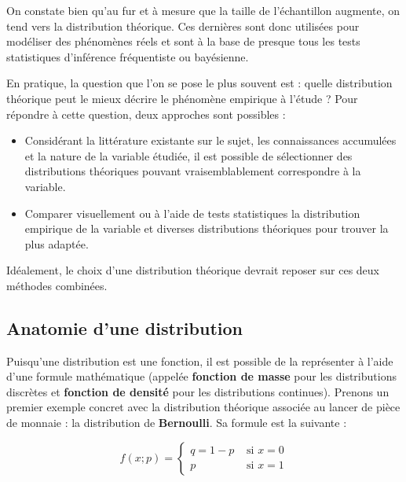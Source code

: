 \documentclass[
  11pt,
  french,
]{book}
\providecommand{\tightlist}{%
  \setlength{\itemsep}{0pt}\setlength{\parskip}{0pt}}
\begin{document}
On constate bien qu'au fur et à mesure que la taille de l'échantillon augmente, on tend vers la distribution théorique. Ces dernières sont donc utilisées pour modéliser des phénomènes réels et sont à la base de presque tous les tests statistiques d'inférence fréquentiste ou bayésienne.

En pratique, la question que l'on se pose le plus souvent est : quelle distribution théorique peut le mieux décrire le phénomène empirique à l'étude ? Pour répondre à cette question, deux approches sont possibles :

\begin{itemize}
\tightlist
\item
  Considérant la littérature existante sur le sujet, les connaissances accumulées et la nature de la variable étudiée, il est possible de sélectionner des distributions théoriques pouvant vraisemblablement correspondre à la variable.
\item
  Comparer visuellement ou à l'aide de tests statistiques la distribution empirique de la variable et diverses distributions théoriques pour trouver la plus adaptée.
\end{itemize}

Idéalement, le choix d'une distribution théorique devrait reposer sur ces deux méthodes combinées.

\hypertarget{anatomie-dune-distribution}{%
\subsection{Anatomie d'une distribution}\label{anatomie-dune-distribution}}

Puisqu'une distribution est une fonction, il est possible de la représenter à l'aide d'une formule mathématique (appelée \textbf{fonction de masse} pour les distributions discrètes et \textbf{fonction de densité} pour les distributions continues). Prenons un premier exemple concret avec la distribution théorique associée au lancer de pièce de monnaie : la distribution de \textbf{Bernoulli}. Sa formule est la suivante :

\begin{equation}f(x ; p)=\left\{\begin{array}{ll}
q=1-p & \text { si } x=0 \\
p & \text { si } x=1
\end{array}\right.
\label{eq:Bernoulli}
\end{equation}
\end{document}
